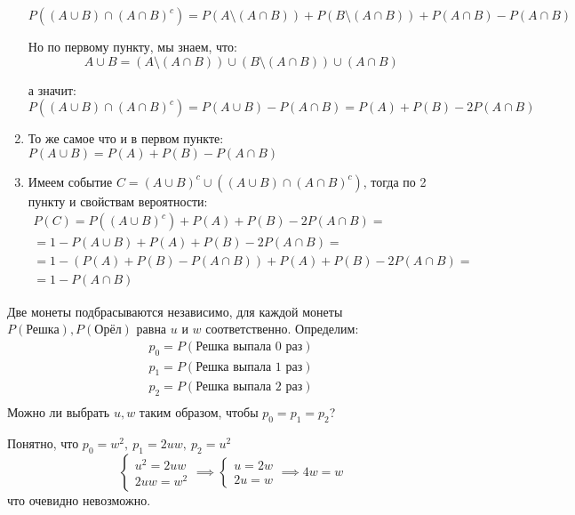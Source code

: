 \documentclass[document]{subfiles}
\begin{document}
\begin{solution}
\begin{enumerate}
            \[P((A \cup B) \cap (A \cap B)^c) = P(A \setminus (A \cap B)) + P(B \setminus (A \cap B)) + P(A \cap B) - P(A \cap B)\]

            Но по первому  пункту, мы знаем, что:
            \[A \cup B = (A \setminus (A \cap B)) \cup (B \setminus (A \cap B)) \cup (A \cap B)\]

            а значит:
            \[P((A \cup B) \cap (A \cap B)^c) = P(A \cup B) - P(A \cap B) = P(A) + P(B) - 2 P(A \cap B)\]
            
        \item То же самое что и в первом пункте: $P(A \cup B) = P(A) + P(B) - P(A \cap B)$

        \item Имеем событие $C = (A \cup B)^c \cup ((A \cup B) \cap (A \cap B)^c)$, тогда по 2 пункту и свойствам вероятности:
            \begin{gather*}
                P(C) = P((A \cup B)^c) + P(A) + P(B) - 2P(A \cap B) = \\
                = 1 - P(A \cup B) + P(A) + P(B) - 2P(A \cap B) = \\
                = 1 - (P(A) + P(B) - P(A \cap B)) + P(A) + P(B) - 2P(A \cap B) = \\ 
                = 1 - P(A \cap B)
            \end{gather*}

    \end{enumerate}
\end{solution}

\begin{problem}
    Две монеты подбрасываются независимо, для каждой монеты $P(\text{Решка}), P(\text{Орёл})$ равна $u$ и $w$ соответственно. Определим:
    \begin{gather*}
        p_0 = P(\text{Решка выпала 0 раз}) \\ 
        p_1 = P(\text{Решка выпала 1 раз}) \\ 
        p_2 = P(\text{Решка выпала 2 раз}) \\ 
    \end{gather*}
    Можно ли выбрать $u, w$ таким образом, чтобы $p_0 = p_1 = p_2$?
\end{problem}
\begin{solution}
    Понятно, что $p_0 = w^2, ~ p_1 = 2uw, ~ p_2 = u^2$
    $$
    \begin{cases}
        u^2 = 2uw \\ 
        2uw = w^2 
    \end{cases} \implies
    \begin{cases}
        u = 2w \\
        2u = w
    \end{cases} \implies
    4w = w
    $$
    что очевидно невозможно.
\end{solution}
\end{document}
